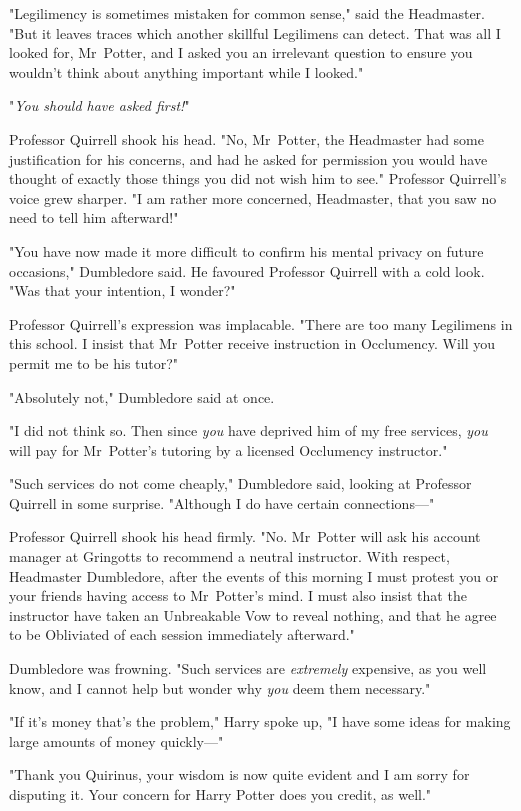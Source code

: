 "Legilimency is sometimes mistaken for common sense," said the Headmaster. "But
it leaves traces which another skillful Legilimens can detect. That was all I
looked for, Mr~Potter, and I asked you an irrelevant question to ensure you
wouldn't think about anything important while I looked."

"\emph{You should have asked first!}"

Professor Quirrell shook his head. "No, Mr~Potter, the Headmaster had some
justification for his concerns, and had he asked for permission you would have
thought of exactly those things you did not wish him to see." Professor
Quirrell's voice grew sharper. "I am rather more concerned, Headmaster, that
you saw no need to tell him afterward!"

"You have now made it more difficult to confirm his mental privacy on future
occasions," Dumbledore said. He favoured Professor Quirrell with a cold look.
"Was that your intention, I wonder?"

Professor Quirrell's expression was implacable. "There are too many Legilimens
in this school. I insist that Mr~Potter receive instruction in Occlumency.
Will you permit me to be his tutor?"

"Absolutely not," Dumbledore said at once.

"I did not think so. Then since \emph{you} have deprived him of my free
services, \emph{you} will pay for Mr~Potter's tutoring by a licensed
Occlumency instructor."

"Such services do not come cheaply," Dumbledore said, looking at Professor
Quirrell in some surprise. "Although I do have certain connections---"

Professor Quirrell shook his head firmly. "No. Mr~Potter will ask his account
manager at Gringotts to recommend a neutral instructor. With respect,
Headmaster Dumbledore, after the events of this morning I must protest you or
your friends having access to Mr~Potter's mind. I must also insist that the
instructor have taken an Unbreakable Vow to reveal nothing, and that he agree
to be Obliviated of each session immediately afterward."

Dumbledore was frowning. "Such services are \emph{extremely} expensive, as you
well know, and I cannot help but wonder why \emph{you} deem them necessary."

"If it's money that's the problem," Harry spoke up, "I have some ideas for
making large amounts of money quickly---"

"Thank you Quirinus, your wisdom is now quite evident and I am sorry for
disputing it. Your concern for Harry Potter does you credit, as well."


